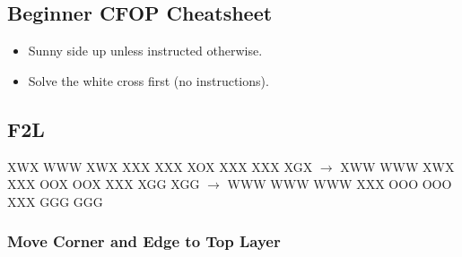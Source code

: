\documentclass[9pt,dvipsnames]{extarticle}
\begin{document}



\begin{multicols*}{4}
\section*{Beginner CFOP Cheatsheet}

\begin{itemize}
  \item Sunny side up unless instructed otherwise.
  \item Solve the white cross first (no instructions).
\end{itemize}

\subsection*{F2L}

\noindent%
\RubikFaceDown
{X}{W}{X}
{W}{W}{W}
{X}{W}{X}%
\RubikFaceRight
{X}{X}{X}
{X}{X}{X}
{X}{O}{X}%
\RubikFaceFront
{X}{X}{X}
{X}{X}{X}
{X}{G}{X}%
\ShowCube{\cubesize}{\cubescale}{\DrawRubikCubeRD}%
$\rightarrow$%
\noindent%
\RubikFaceDown
{X}{W}{W}
{W}{W}{W}
{X}{W}{X}%
\RubikFaceRight
{X}{X}{X}
{O}{O}{X}
{O}{O}{X}%
\RubikFaceFront
{X}{X}{X}
{X}{G}{G}
{X}{G}{G}%
\ShowCube{\cubesize}{\cubescale}{\DrawRubikCubeRD}%
$\rightarrow$%
\RubikFaceDown
{W}{W}{W}
{W}{W}{W}
{W}{W}{W}%
\RubikFaceRight
{X}{X}{X}
{O}{O}{O}
{O}{O}{O}%
\RubikFaceFront
{X}{X}{X}
{G}{G}{G}
{G}{G}{G}%
\ShowCube{\cubesize}{\cubescale}{\DrawRubikCubeRD}




\subsubsection*{Move Corner and Edge to Top Layer}


\end{multicols*}
\end{document}
